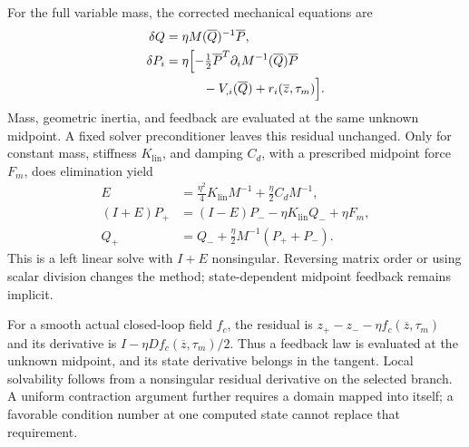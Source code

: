 For the full variable mass, the corrected mechanical equations are
\begin{equation}
 \begin{aligned}
 \delta Q&=\eta M(\overline Q)^{-1}\overline P,\\
 \delta P_i&=\eta\Bigl[-\tfrac12\overline P^T
                  \partial_iM^{-1}(\overline Q)\overline P\\
 &\hspace{3em}-V_{,i}(\overline Q)+r_i(\overline z,\tau_m)\Bigr].
\end{aligned}
 \label{eq:th-mechanical-midpoint}
\end{equation}
Mass, geometric inertia, and feedback are evaluated at the same unknown midpoint. A fixed solver preconditioner leaves this residual unchanged. Only for constant mass, stiffness $K_{\mathrm{lin}}$, and damping $C_d$, with a prescribed midpoint force $F_m$, does elimination yield
\begin{equation}
 \begin{aligned}
 E&=\tfrac{\eta^2}{4}K_{\mathrm{lin}}M^{-1}+\tfrac\eta2 C_dM^{-1},\\
 (I+E)P_+&=(I-E)P_- -\eta K_{\mathrm{lin}}Q_-+\eta F_m,\\
 Q_+&=Q_-+\tfrac\eta2 M^{-1}(P_++P_-).
 \end{aligned}
 \label{eq:th-leftsolve}
\end{equation}
This is a left linear solve with $I+E$ nonsingular. Reversing matrix order or using scalar division changes the method; state-dependent midpoint feedback remains implicit.

For a smooth actual closed-loop field $f_c$, the residual is $z_+-z_- -\eta f_c(\overline z,\tau_m)$ and its derivative is $I-\eta Df_c(\overline z,\tau_m)/2$. Thus a feedback law is evaluated at the unknown midpoint, and its state derivative belongs in the tangent. Local solvability follows from a nonsingular residual derivative on the selected branch. A uniform contraction argument further requires a domain mapped into itself; a favorable condition number at one computed state cannot replace that requirement.

